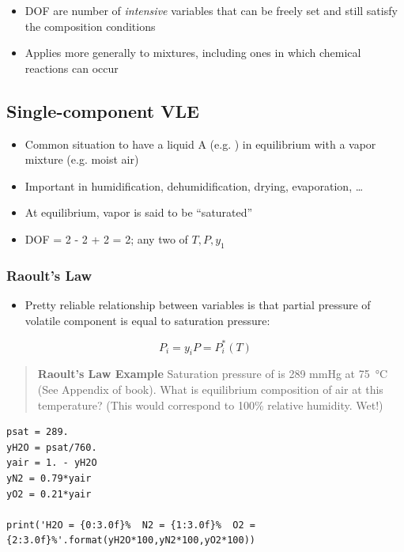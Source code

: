 \documentclass[11pt]{article}
\begin{document}
\begin{itemize}
\item DOF are number of \emph{intensive} variables that can be freely set and still satisfy the composition conditions
\item Applies more generally to mixtures, including ones in which chemical reactions can occur
\end{itemize}

\subsection{Single-component VLE}
\label{sec-8-3}
\begin{itemize}
\item Common situation to have a liquid A (e.g. ) in equilibrium with a vapor mixture (e.g. moist air)
\item Important in humidification, dehumidification, drying, evaporation, \ldots
\item At equilibrium, vapor is said to be ``saturated''
\item DOF = 2 - 2 + 2 = 2; any two of \(T, P, y_{1}\)
\end{itemize}

\subsubsection{Raoult's Law}
\label{sec-8-3-1}
\begin{itemize}
\item Pretty reliable relationship between variables is that partial pressure of volatile component is equal to saturation pressure:
\end{itemize}

\[ P_{i} = y_{i}P = P_{i}^{*}(T) \]

\begin{quote}
\textbf{Raoult's Law Example}  Saturation pressure of  is 289 mmHg at \SI{75}{\celsius} (See Appendix of book).  What is equilibrium composition of air at this temperature?  (This would correspond to 100\% relative humidity.  Wet!)
\end{quote}

\begin{verbatim}
psat = 289.
yH2O = psat/760.
yair = 1. - yH2O
yN2 = 0.79*yair
yO2 = 0.21*yair

print('H2O = {0:3.0f}%  N2 = {1:3.0f}%  O2 = {2:3.0f}%'.format(yH2O*100,yN2*100,yO2*100))
\end{verbatim}
\end{document}
